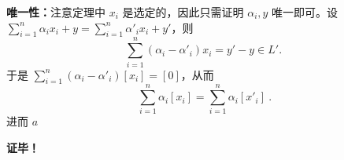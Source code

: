 \textbf{唯一性：}注意定理中 $x_i$ 是选定的，因此只需证明 $\alpha_i,y$ 唯一即可。设 $\sum\limits_{i=1}^n\alpha_i x_i+y=\sum\limits_{i=1}^n\alpha'_i x_i+y'$，则
\begin{equation}
\sum_{i=1}^n(\alpha_i -\alpha'_i) x_i=y'-y\in L'.~
\end{equation}
于是 $\sum_{i=1}^n(\alpha_i -\alpha'_i) [x_i]=[0]$，从而
\begin{equation}
\sum_{i=1}^n \alpha_i[x_i]=\sum_{i=1}^n \alpha_i[x'_i]~.
\end{equation}
进而 $a$




\textbf{证毕！}

